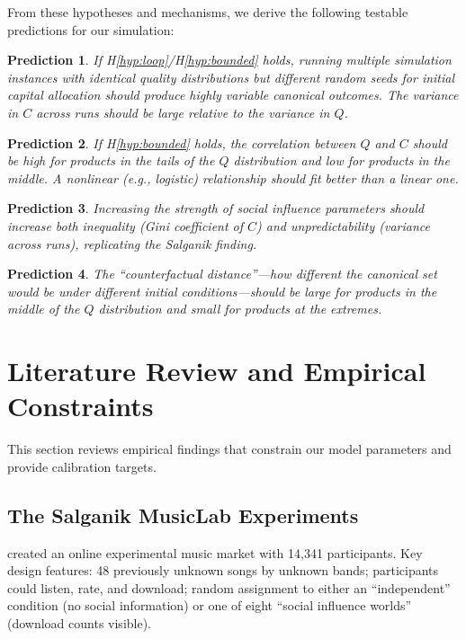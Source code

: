 \documentclass[11pt,a4paper]{article}
\newtheorem{prediction}{Prediction}
\begin{document}
From these hypotheses and mechanisms, we derive the following testable predictions for our simulation:

\begin{prediction}
If H\ref{hyp:loop}/H\ref{hyp:bounded} holds, running multiple simulation instances with identical quality distributions but different random seeds for initial capital allocation should produce highly variable canonical outcomes. The variance in $C$ across runs should be large relative to the variance in $Q$.
\end{prediction}

\begin{prediction}
If H\ref{hyp:bounded} holds, the correlation between $Q$ and $C$ should be high for products in the tails of the $Q$ distribution and low for products in the middle. A nonlinear (e.g., logistic) relationship should fit better than a linear one.
\end{prediction}

\begin{prediction}
Increasing the strength of social influence parameters should increase both inequality (Gini coefficient of $C$) and unpredictability (variance across runs), replicating the Salganik finding.
\end{prediction}

\begin{prediction}
The ``counterfactual distance''---how different the canonical set would be under different initial conditions---should be large for products in the middle of the $Q$ distribution and small for products at the extremes.
\end{prediction}

\section{Literature Review and Empirical Constraints}
\label{sec:literature}

This section reviews empirical findings that constrain our model parameters and provide calibration targets.

\subsection{The Salganik MusicLab Experiments}

\citet{salganik2006} created an online experimental music market with 14,341 participants. Key design features: 48 previously unknown songs by unknown bands; participants could listen, rate, and download; random assignment to either an ``independent'' condition (no social information) or one of eight ``social influence worlds'' (download counts visible).
\end{document}
